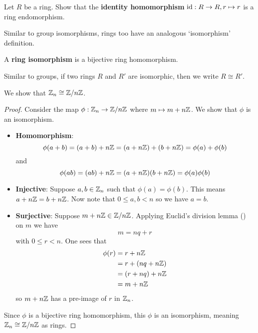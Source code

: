 \begin{exercise}
    Let $R$ be a ring. Show that the \textbf{identity homomorphism} $\mathrm{id}: R \to R, r \mapsto r$ is a ring endomorphism.
\end{exercise}

Similar to group isomorphisms, rings too have an analogous `isomorphism' definition.
\begin{definition}
    A \textbf{ring isomorphism} is a bijective ring homomorphism.
\end{definition}
Similar to groups, if two rings $R$ and $R'$ are isomorphic, then we write $R \cong R'$.

\begin{example}
    We show that $\mathbb{Z}_n \cong \mathbb{Z}/n\mathbb{Z}$.

    \begin{proof}
        Consider the map $\phi:\mathbb{Z}_n \to \mathbb{Z}/n\mathbb{Z}$ where $m \mapsto m + n\mathbb{Z}$. We show that $\phi$ is an isomorphism.
        \begin{itemize}
            \item \textbf{Homomorphism}:
            \[
                \phi(a+b) = (a+b) + n\mathbb{Z} = (a + n\mathbb{Z}) + (b + n\mathbb{Z}) = \phi(a) + \phi(b)
            \]
            and
            \[
                \phi(ab) = (ab) + n\mathbb{Z} = (a+n\mathbb{Z})(b+n\mathbb{Z}) = \phi(a)\phi(b)
            \]

            \item \textbf{Injective}: Suppose $a, b \in \mathbb{Z}_n$ such that $\phi(a) = \phi(b)$. This means $a + n\mathbb{Z} = b + n\mathbb{Z}$. Now note that $0 \leq a,b < n$ so we have $a = b$.
            
            \item \textbf{Surjective}: Suppose $m + n\mathbb{Z} \in \mathbb{Z}/n\mathbb{Z}$. Applying Euclid's division lemma () on $m$ we have
            \[
                m = nq + r
            \]
            with $0 \leq r < n$. One sees that
            \begin{align*}
                \phi(r) &= r + n\mathbb{Z}\\
                &= r + (nq + n\mathbb{Z})\\
                &= (r + nq) + n\mathbb{Z}\\
                &= m + n\mathbb{Z}
            \end{align*}
            so $m + n\mathbb{Z}$ has a pre-image of $r$ in $\mathbb{Z}_n$.
        \end{itemize}
        Since $\phi$ is a bijective ring homomorphism, this $\phi$ is an isomorphism, meaning $\mathbb{Z}_n \cong \mathbb{Z}/n\mathbb{Z}$ as rings.
    \end{proof}
\end{example}
